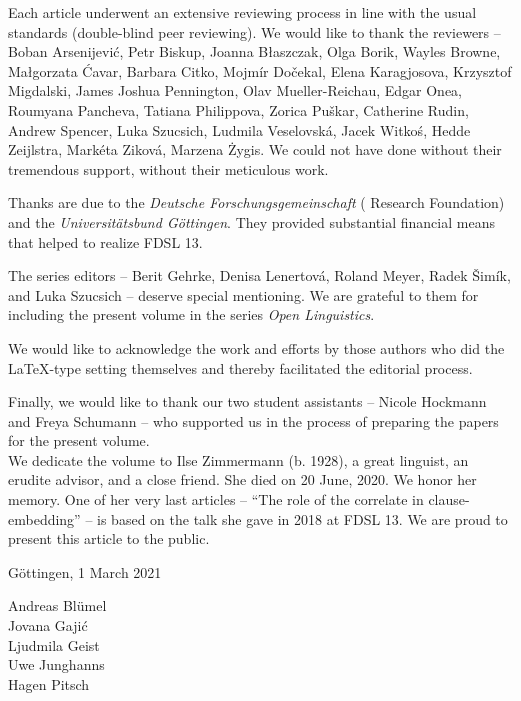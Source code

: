 \largerpage[-1]

Each article underwent an extensive reviewing process in line with the usual standards (double-blind peer reviewing). We would like to thank the reviewers -- Boban Arsenijević, Petr Biskup, Joanna Błaszczak, Olga Borik, Wayles Browne, Małgorzata Ćavar, Barbara Citko, Mojmír Dočekal, Elena Karagjosova, Krzysztof Migdalski, James Joshua Pennington, Olav Mueller-Reichau, Edgar Onea, Roum\-yana Pancheva, Tatiana Philippova, Zorica Puškar, Catherine Rudin, Andrew Spencer, Luka Szucsich, Ludmila Veselovská, Jacek Witkoś, Hedde Zeijlstra, \linebreak Markéta Ziková, Marzena Żygis. We could not have done without their tremendous support, without their meticulous work.

Thanks are due to the \textit{Deutsche Forschungsgemeinschaft} ( Research Foundation) and the \textit{Universitätsbund Göttingen}. They provided substantial financial means that helped to realize FDSL 13.

The series editors -- Berit Gehrke, Denisa Lenertová, Roland Meyer, Radek Šimík, and Luka Szucsich -- deserve special mentioning. We are grateful to them for including the present volume in the series \textit{Open  Linguistics}.

We would like to acknowledge the work and efforts by those authors who did the \LaTeX-type setting themselves and thereby facilitated the editorial process.

Finally, we would like to thank our two student assistants -- Nicole Hockmann and Freya Schumann -- who supported us in the process of preparing the papers for the present volume.\\

\noindent We dedicate the volume to Ilse Zimmermann (b. 1928), a great linguist, an erudite advisor, and a close friend. She died on 20 June, 2020. We honor her memory. One of her very last articles – ``The role of the correlate in clause-embedding'' – is based on the talk she gave in 2018 at FDSL 13. We are proud to present this article to the public.

\null\hfill Göttingen, 1 March 2021

\null\hfill Andreas Blümel\\
\null\hfill Jovana Gajić\\
\null\hfill Ljudmila Geist\\
\null\hfill Uwe Junghanns\\
\null\hfill Hagen Pitsch\\

% 
